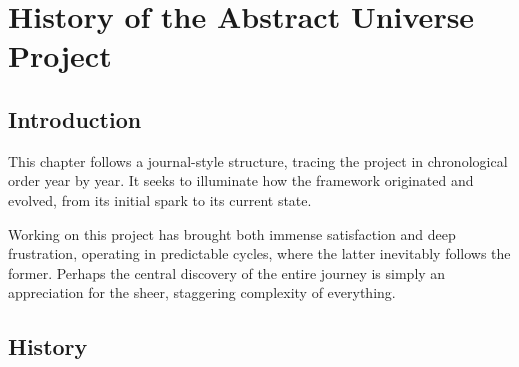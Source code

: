 \chapter{History of the Abstract Universe Project}
\label{chap:history}

\section*{Introduction}

This chapter follows a journal-style structure, tracing the project in chronological order year by year.
It seeks to illuminate how the framework originated and evolved, from its initial spark to its current state.

Working on this project has brought both immense satisfaction and deep frustration, operating in predictable cycles,
where the latter inevitably follows the former.
Perhaps the central discovery of the entire journey is simply an appreciation for the sheer, staggering complexity of everything.


\section*{History}


